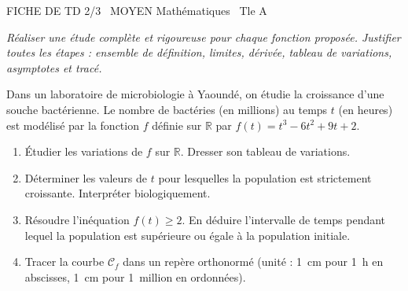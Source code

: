 \documentclass[11pt]{article}
\begin{document}
\begin{tcolorbox}[enhanced,colback=popink,colframe=popink,arc=10pt,boxrule=0pt,left=12pt,right=12pt,top=9pt,bottom=9pt]
{\color{white}\popxbold\small FICHE DE TD 2/3 \textbullet\ MOYEN \hfill Mathématiques \textbullet\ Tle A\par}
\end{tcolorbox}
\vspace{4pt}
\emph{Réaliser une étude complète et rigoureuse pour chaque fonction proposée. Justifier toutes les étapes : ensemble de définition, limites, dérivée, tableau de variations, asymptotes et tracé.}

\begin{exercice}
Dans un laboratoire de microbiologie à Yaoundé, on étudie la croissance d'une souche bactérienne. Le nombre de bactéries (en millions) au temps $t$ (en heures) est modélisé par la fonction $f$ définie sur $\mathbb{R}$ par $f(t) = t^3 - 6t^2 + 9t + 2$.
\begin{enumerate}
    \item Étudier les variations de $f$ sur $\mathbb{R}$. Dresser son tableau de variations.
    \item Déterminer les valeurs de $t$ pour lesquelles la population est strictement croissante. Interpréter biologiquement.
    \item Résoudre l'inéquation $f(t) \ge 2$. En déduire l'intervalle de temps pendant lequel la population est supérieure ou égale à la population initiale.
    \item Tracer la courbe $\mathcal{C}_f$ dans un repère orthonormé (unité : \SI{1}{cm} pour \SI{1}{h} en abscisses, \SI{1}{cm} pour \SI{1}{million} en ordonnées).
\end{enumerate}
\end{exercice}
\end{document}
